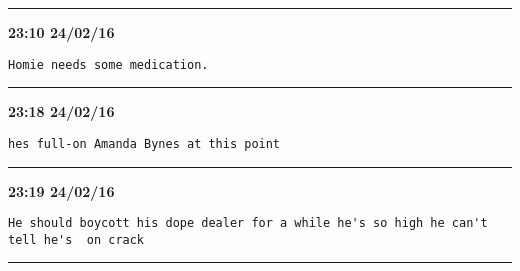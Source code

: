 \hrule%

\begin{adjustwidth}{0cm}{0cm}
\footnotesize \textbf{23:10 24/02/16}

\begin{lstlisting}[breaklines, breakatwhitespace, basicstyle=\small, frame=leftline]
Homie needs some medication.
\end{lstlisting}
\end{adjustwidth}

\hrule%

\begin{adjustwidth}{0cm}{0cm}
\footnotesize \textbf{23:18 24/02/16}

\begin{lstlisting}[breaklines, breakatwhitespace, basicstyle=\small, frame=leftline]
hes full-on Amanda Bynes at this point
\end{lstlisting}
\end{adjustwidth}

\hrule%

\begin{adjustwidth}{0cm}{0cm}
\footnotesize \textbf{23:19 24/02/16}

\begin{lstlisting}[breaklines, breakatwhitespace, basicstyle=\small, frame=leftline]
He should boycott his dope dealer for a while he's so high he can't tell he's  on crack
\end{lstlisting}
\end{adjustwidth}

\hrule%

